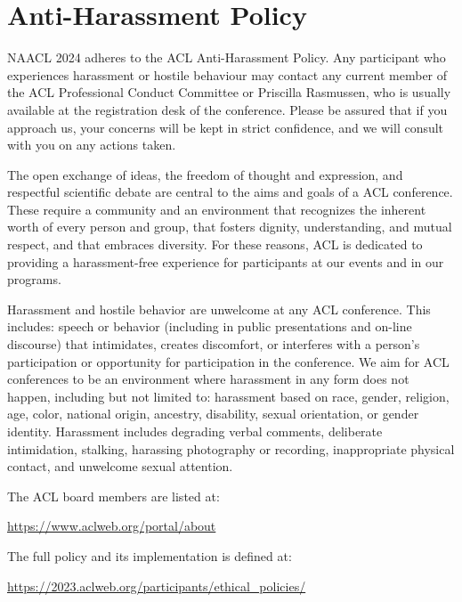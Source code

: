 \chapter[Anti-Harassment Policy]{Anti-Harassment Policy}
\thispagestyle{emptyheader}
\setheaders{}{}
\setlength{\parskip}{1ex}

NAACL 2024 adheres to the ACL Anti-Harassment Policy. Any participant who experiences harassment or hostile behaviour may contact any current member of the ACL Professional Conduct Committee or Priscilla Rasmussen, who is usually available at the registration desk of the conference. Please be assured that if you approach us, your concerns will be kept in strict confidence, and we will consult with you on any actions taken.

The open exchange of ideas, the freedom of thought and expression, and respectful scientific debate are central to the aims and goals of a ACL conference. These require a community and an environment that recognizes the inherent worth of every person and group, that fosters dignity, understanding, and mutual respect, and that embraces diversity. For these reasons, ACL is dedicated to providing a harassment-free experience for participants at our events and in our programs.

Harassment and hostile behavior are unwelcome at any ACL conference. This includes: speech or behavior (including in public presentations and on-line discourse) that intimidates, creates discomfort, or interferes with a person's participation or opportunity for participation in the conference. We aim for ACL conferences to be an environment where harassment in any form does not happen, including but not limited to: harassment based on race, gender, religion, age, color, national origin, ancestry, disability, sexual orientation, or gender identity. Harassment includes degrading verbal comments, deliberate intimidation,
stalking, harassing photography or recording, inappropriate physical contact, and unwelcome sexual attention.

The ACL board members are listed at:

\url{https://www.aclweb.org/portal/about}

The full policy and its implementation is defined at:

\url{https://2023.aclweb.org/participants/ethical_policies/}
